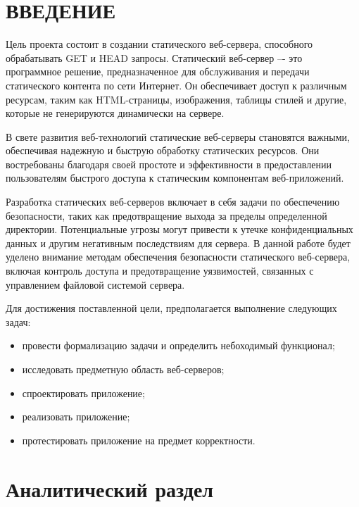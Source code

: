 \documentclass{bmstu}
\begin{document}

\chapter*{ВВЕДЕНИЕ}

Цель проекта состоит в создании статического веб-сервера, способного обрабатывать GET и HEAD запросы. 
Статический веб-сервер –- это программное решение, предназначенное для обслуживания и 
передачи статического контента по сети Интернет. Он обеспечивает доступ к различным ресурсам, 
таким как HTML-страницы, изображения, таблицы стилей и другие, которые не генерируются 
динамически на сервере.

В свете развития веб-технологий статические веб-серверы становятся важными, обеспечивая надежную и 
быструю обработку статических ресурсов. Они востребованы благодаря своей простоте и эффективности в 
предоставлении пользователям быстрого доступа к статическим компонентам веб-приложений.

Разработка статических веб-серверов включает в себя задачи по обеспечению безопасности, таких как 
предотвращение выхода за пределы определенной директории. Потенциальные угрозы могут привести к 
утечке конфиденциальных данных и другим негативным последствиям для сервера. В данной работе будет 
уделено внимание методам обеспечения безопасности статического веб-сервера, включая контроль 
доступа и предотвращение уязвимостей, связанных с управлением файловой системой сервера.

Для достижения поставленной цели, предполагается выполнение следующих задач:

\begin{itemize}
	\item провести формализацию задачи и определить небоходимый функционал;
	\item исследовать предметную область веб-серверов;
	\item спроектировать приложение;
	\item реализовать приложение;
	\item протестировать приложение на предмет корректности.
\end{itemize}

\chapter{Аналитический раздел}
\end{document}
